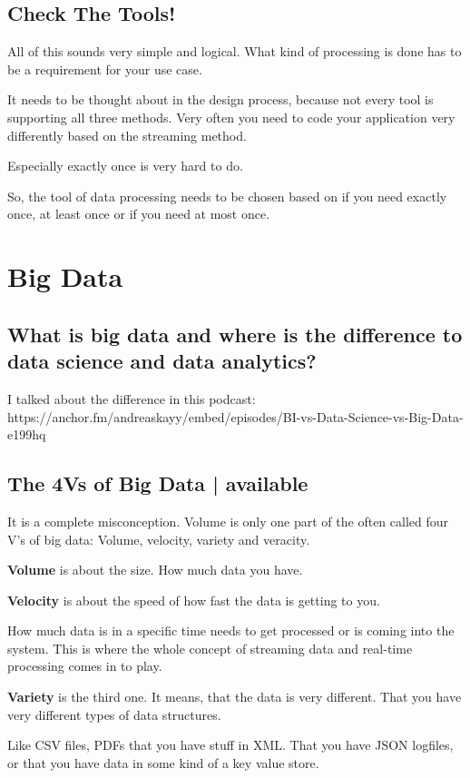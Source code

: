 \documentclass[12pt, numbers=noenddot]{scrreprt} %
\begin{document}
\section{Check The Tools!}

All of this sounds very simple and logical. What kind of processing is done has to be a requirement for your use case.

It needs to be thought about in the design process, because not every tool is supporting all three methods. Very often you need to code your application very differently based on the streaming method.

Especially exactly once is very hard to do.

So, the tool of data processing needs to be chosen based on if you need exactly once, at least once or if you need at most once.

\chapter{Big Data}
\section{What is big data and where is the difference to data science and data analytics?}
I talked about the difference in this podcast: https://anchor.fm/andreaskayy/embed/episodes/BI-vs-Data-Science-vs-Big-Data-e199hq

\section{The 4Vs of Big Data | available}

It is a complete misconception. Volume is only one part of the often called four V’s of big data: Volume, velocity, variety and veracity.

\textbf{Volume} is about the size. How much data you have.

\textbf{Velocity} is about the speed of how fast the data is getting to you.

How much data is in a specific time needs to get processed or is coming into the system. This is where the whole concept of streaming data and real-time processing comes in to play.

\textbf{Variety} is the third one. It means, that the data is very different. That you have very different types of data structures.

Like CSV files, PDFs that you have stuff in XML. That you have JSON logfiles, or that you have data in some kind of a key value store.
\end{document}
